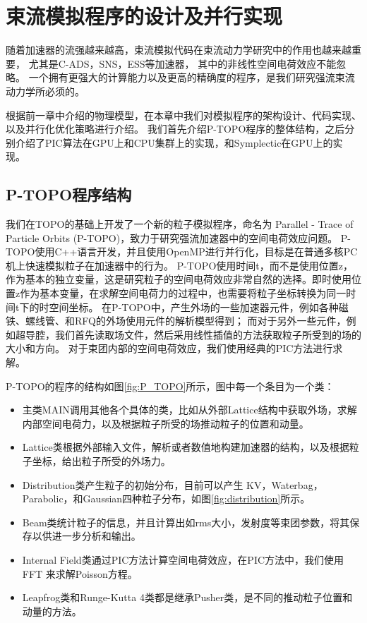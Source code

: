 
\chapter{束流模拟程序的设计及并行实现}
\label{chap:Code}
随着加速器的流强越来越高，束流模拟代码在束流动力学研究中的作用也越来越重要，
尤其是C-ADS，SNS，ESS等加速器\cite{li2013ADS,henderson2014SNS,eshraqi2016ess}，
其中的非线性空间电荷效应不能忽略。
一个拥有更强大的计算能力以及更高的精确度的程序，是我们研究强流束流动力学所必须的。

根据前一章中介绍的物理模型，在本章中我们对模拟程序的架构设计、代码实现、以及并行化优化策略进行介绍。
我们首先介绍P-TOPO程序的整体结构，之后分别介绍了PIC算法在GPU上和CPU集群上的实现，和Symplectic在GPU上的实现。

\section{P-TOPO程序结构}
我们在TOPO\cite{chao2014TOPOPIC}的基础上开发了一个新的粒子模拟程序，命名为 Parallel - Trace of Particle Orbits (P-TOPO)，致力于研究强流加速器中的空间电荷效应问题\cite{li2016nonlinear,li2014envelope,li16collective,li2015space}。
P-TOPO使用C++语言开发，并且使用OpenMP进行并行化，目标是在普通多核PC机上快速模拟粒子在加速器中的行为。
P-TOPO使用时间t，而不是使用位置z，作为基本的独立变量，这是研究粒子的空间电荷效应非常自然的选择。即时使用位置z作为基本变量，在求解空间电荷力的过程中，也需要将粒子坐标转换为同一时间t下的时空间坐标。
在P-TOPO中，产生外场的一些加速器元件，例如各种磁铁、螺线管、和RFQ的外场使用元件的解析模型得到；
而对于另外一些元件，例如超导腔，我们首先读取场文件\cite{studio2008cst}，然后采用线性插值的方法获取粒子所受到的场的大小和方向。
对于束团内部的空间电荷效应，我们使用经典的PIC方法进行求解。

P-TOPO的程序的结构如图\ref{fig:P_TOPO}所示，图中每一个条目为一个类：
\begin{itemize}
  \item 主类MAIN调用其他各个具体的类，比如从外部Lattice结构中获取外场，求解内部空间电荷力，以及根据粒子所受的场推动粒子的位置和动量。
  \item Lattice类根据外部输入文件，解析或者数值地构建加速器的结构，以及根据粒子坐标，给出粒子所受的外场力。
  \item Distribution类产生粒子的初始分布，目前可以产生 KV，Waterbag，Parabolic，和Gaussian四种粒子分布，如图\ref{fig:distribution}所示。
  \item Beam类统计粒子的信息，并且计算出如rms大小，发射度等束团参数，将其保存以供进一步分析和输出。
  \item Internal Field类通过PIC方法计算空间电荷效应，在PIC方法中，我们使用FFT 来求解Poisson方程。
  \item Leapfrog类和Runge-Kutta 4类都是继承Pusher类，是不同的推动粒子位置和动量的方法。
\end{itemize}

